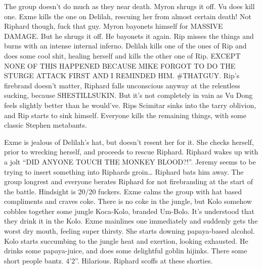 The group doesn’t do much as they near death. Myron shrugs it off. Vu does kill one. Exme kills the one on Delilah, rescuing her from almost certain death! Not Riphard though, fuck that guy. Myron bayonets himself for MASSIVE DAMAGE. But he shrugs it off. He bayonets it again. Rip misses the things and burns with an intense internal inferno. Delilah kills one of the ones of Rip and does some cool shit, healing herself and kills the other one of Rip. EXCEPT NONE OF THIS HAPPENED BECAUSE MIKE FORGOT TO DO THE STURGE ATTACK FIRST AND I REMINDED HIM. \#THATGUY. Rip’s firebrand doesn’t matter, Riphard falls unconscious anyway at the relentless sucking, because SHESTILLSUKIN. But it’s not completely in vain as Vu Dong feels slightly better than he would’ve. Rips Scimitar sinks into the tarry oblivion, and Rip starts to sink himself. Everyone kills the remaining things, with some classic Stephen metabants.\medskip

Exme is jealous of Delilah’s hat, but doesn’t resent her for it. She checks herself, prior to wrecking herself, and proceeds to rescue Riphard. Riphard wakes up with a jolt “DID ANYONE TOUCH THE MONKEY BLOOD?!”. Jeremy seems to be trying to insert something into Riphards groin… Riphard bats him away. The group longrest and everyone berates Riphard for not firebranding at the start of the battle. Hindsight is 20/20 fuckers. Exme calms the group with hat based compliments and craves coke. There is no coke in the jungle, but Kolo somehow cobbles together some jungle Koca-Kolo, branded Um-Bolo. It’s understood that they drink it in the Kolo. Exme mainlines one immediately and suddenly gets the worst dry mouth, feeling super thirsty. She starts downing papaya-based alcohol. Kolo starts succumbing to the jungle heat and exertion, looking exhausted. He drinks some papaya-juice, and does some delightful goblin hijinks. There some short people bantz. 4’2”. Hilarious. Riphard scoffs at these shorties.\medskip

